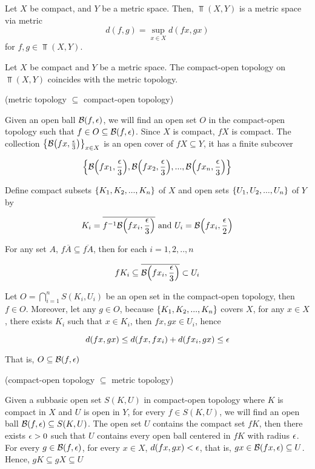\documentclass{article}
\begin{document}
\begin{definition}
    Let $X$ be compact, and $Y$ be a metric space. Then, $\Top(X, Y)$ is a metric space via metric
    $$
        d(f, g) = \sup_{x \in X} d(fx, gx)
    $$
    for $f, g \in \Top(X, Y)$. 
\end{definition}

\begin{theorem}
    Let $X$ be compact and $Y$ be a metric space. The compact-open topology on $\Top(X, Y)$ coincides with the metric topology.
\end{theorem}

\begin{longproof}

    (metric topology $\subseteq$ compact-open topology)

    Given an open ball $\mathcal{B}(f, \epsilon)$, we will find an open set $O$ in the compact-open topology such that $f \in O \subseteq \mathcal{B}(f, \epsilon)$. Since $X$ is compact, $fX$ is compact. The collection $\set*{\Ball\tuple*{fx, \frac{\eps}{3}}}_{x \in X}$ is an open cover of $fX \subseteq Y$, it has a finite subcover
    
    $$
        \set*{\Ball\tuple*{fx_1, \frac{\eps}{3}},    \Ball\tuple*{fx_2, \frac{\eps}{3}}, ..., \Ball\tuple*{fx_n, \frac{\eps}{3}}}
    $$

    Define compact subsets $\{K_1, K_2, ..., K_n\}$ of $X$ and open sets $\{U_1, U_2, ..., U_n\}$ of $Y$ by
    
    $$
        K_i = \overline{f^{-1} \Ball \tuple*{fx_i, \frac{\eps}{3}}} \text{ and } U_i = \Ball\tuple*{fx_i, \frac{\eps}{2}}
    $$

    For any set $A$, $f \overline{A} \subseteq \overline{f A}$, then for each $i = 1, 2, .., n$
    
    $$
        f K_i \subseteq \overline{\Ball \tuple*{fx_i, \frac{\eps}{3}}} \subset U_i
    $$

    Let $O = \bigcap_{i=1}^n S(K_i, U_i)$ be an open set in the compact-open topology, then $f \in O$. Moreover, let any $g \in O$, because $\{K_1, K_2, ..., K_n\}$ covers $X$, for any $x \in X$, there exists $K_i$ such that $x \in K_i$, then $fx, gx \in U_i$, hence

    $$
        d(fx, gx) \leq d(fx, fx_i) + d(fx_i, gx) \leq \epsilon
    $$

    That is, $O \subseteq \mathcal{B}(f, \epsilon)$

    (compact-open topology $\subseteq$ metric topology)

    Given a subbasic open set $S(K, U)$ in compact-open topology where $K$ is compact in $X$ and $U$ is open in $Y$, for every $f \in S(K, U)$, we will find an open ball $\mathcal{B}(f, \epsilon) \subseteq S(K, U)$. The open set $U$ contains the compact set $fK$, then there exists $\epsilon > 0$ such that $U$ contains every open ball centered in $fK$ with radius $\epsilon$. For every $g \in \mathcal{B}(f, \epsilon)$, for every $x \in X$, $d(fx, gx) < \epsilon$, that is, $gx \in \mathcal{B}(fx, \epsilon) \subseteq U$. Hence, $gK \subseteq gX \subseteq U$

\end{longproof}
\end{document}
